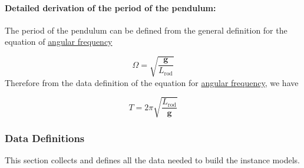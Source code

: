 \documentclass[12pt]{article}
\begin{document}
\paragraph{Detailed derivation of the period of the pendulum:}
\label{GD:periodPendDeriv}
The period of the pendulum can be defined from the general definition for the equation of \hyperref[GD:angFrequencyGD]{angular frequency}

\begin{displaymath}
Ω=\sqrt{\frac{\symbf{g}}{{L_{\text{rod}}}}}
\end{displaymath}
Therefore from the data definition of the equation for \hyperref[DD:angFrequencyDD]{angular frequency}, we have

\begin{displaymath}
T=2 π \sqrt{\frac{{L_{\text{rod}}}}{\symbf{g}}}
\end{displaymath}
\subsubsection{Data Definitions}
\label{Sec:DDs}
This section collects and defines all the data needed to build the instance models.
\end{document}
